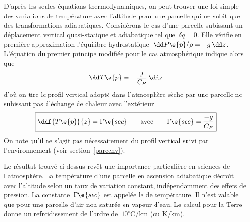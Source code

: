 \sk
D'après les seules équations thermodynamiques, on peut trouver une loi simple des variations de température avec l'altitude pour une parcelle qui ne subit que des transformations adiabatiques. Considérons le cas d'une parcelle subissant un déplacement vertical quasi-statique et adiabatique tel que~$\delta q = 0$. Elle vérifie en première approximation l'équilibre hydrostatique~$\dd P\e{p} / \rho = - g \, \dd z$. L'équation du premier principe modifiée pour le cas atmosphérique indique alors que
\[  \dd T\e{p}  = - \frac{g}{C_P} \, \dd z \]
d'où on tire le profil vertical adopté dans l'atmosphère sèche par une parcelle ne subissant pas d'échange de chaleur avec l'extérieur
\[  \boxed{ \ddf{T\e{p}}{z}  = \Gamma\e{sec} \qquad \text{avec} \qquad \Gamma\e{sec} = \frac{-g}{C_P} } \]
On note qu'il ne s'agit pas nécessairement du profil vertical suivi par l'environnement (voir section~\ref{parcenv}).

\sk
Le résultat trouvé ci-dessus revêt une importance particulière en sciences de l'atmosphère. La température d'une parcelle en ascension adiabatique décroît avec l'altitude selon un taux de variation constant, indépendamment des effets de pression. La constante~$\Gamma\e{sec}$ est appelée le  de température. Il n'est valable que pour une parcelle d'air non saturée en vapeur d'eau. Le calcul pour la Terre donne un refroidissement de l'ordre de~$10^{\circ}$C/km (ou K/km). 




